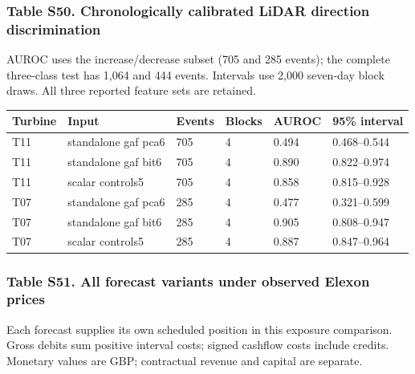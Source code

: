 \documentclass[a4paper,11pt]{article}
\newcounter{none}
\begin{document}
\subsubsection{Table S50. Chronologically calibrated LiDAR direction discrimination}\label{table-s50.-chronologically-calibrated-lidar-direction-discrimination}

AUROC uses the increase/decrease subset (705 and 285 events); the complete three-class test has 1,064 and 444 events. Intervals use 2,000 seven-day block draws. All three reported feature sets are retained.

{\def\LTcaptype{none} %
\begin{longtable}[]{@{}llllll@{}}
\toprule\noalign{}
Turbine & Input & Events & Blocks & AUROC & 95\% interval \\
\midrule\noalign{}
\endhead
\bottomrule\noalign{}
\endlastfoot
T11 & standalone gaf pca6 & 705 & 4 & 0.494 & 0.468--0.544 \\
T11 & standalone gaf bit6 & 705 & 4 & 0.890 & 0.822--0.974 \\
T11 & scalar controls5 & 705 & 4 & 0.858 & 0.815--0.928 \\
T07 & standalone gaf pca6 & 285 & 4 & 0.477 & 0.321--0.599 \\
T07 & standalone gaf bit6 & 285 & 4 & 0.905 & 0.808--0.947 \\
T07 & scalar controls5 & 285 & 4 & 0.887 & 0.847--0.964 \\
\end{longtable}
}

\subsubsection{Table S51. All forecast variants under observed Elexon prices}\label{table-s51.-all-forecast-variants-under-observed-elexon-prices}

Each forecast supplies its own scheduled position in this exposure comparison. Gross debits sum positive interval costs; signed cashflow costs include credits. Monetary values are GBP; contractual revenue and capital are separate.
\end{document}
